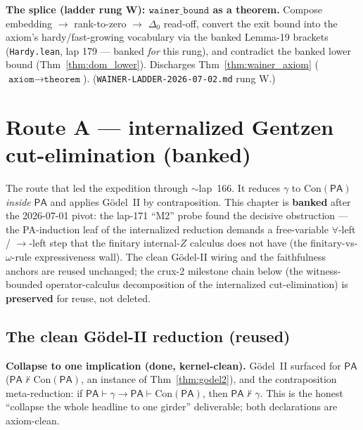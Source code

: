 \begin{theorem}\label{thm:wainer_splice}
  \leanok
\textbf{The splice (ladder rung W): \(\texttt{wainer\_bound}\) as a theorem.}  Compose
embedding \(\to\) rank-to-zero \(\to\) \(\Delta_0\) read-off, convert the exit bound into the
axiom's hardy/fast-growing vocabulary via the banked Lemma-19 brackets (\texttt{Hardy.lean},
lap 179 --- banked \emph{for} this rung), and contradict the banked lower bound
(Thm~\ref{thm:dom_lower}).  Discharges Thm~\ref{thm:wainer_axiom}
(\(\texttt{axiom}\to\texttt{theorem}\)).  (\texttt{WAINER-LADDER-2026-07-02.md} rung W.)
\end{theorem}


\chapter{Route A --- internalized Gentzen cut-elimination (banked)}\label{chp:routeA}

The route that led the expedition through \(\sim\)lap~166.  It reduces \(\gamma\) to
\(\mathrm{Con}(\mathsf{PA})\) \emph{inside} \(\mathsf{PA}\) and applies Gödel~II by contraposition.  This
chapter is \textbf{banked} after the 2026-07-01 pivot: the lap-171 ``M2'' probe found the decisive
obstruction --- the PA-induction leaf of the internalized reduction demands a free-variable
\(\forall\)-left / \(\to\)-left step that the finitary internal-\(Z\) calculus does not have (the
finitary-vs-\(\omega\)-rule expressiveness wall).  The clean Gödel-II wiring and the faithfulness
anchors are reused unchanged; the crux-2 milestone chain below (the witness-bounded operator-calculus
decomposition of the internalized cut-elimination) is \textbf{preserved} for reuse, not deleted.

\section{The clean Gödel-II reduction (reused)}

\begin{theorem}\label{thm:godel2_reduction}
  \leanok
\textbf{Collapse to one implication (done, kernel-clean).}  Gödel~II surfaced for \(\mathsf{PA}\)
(\(\mathsf{PA}\nvdash\mathrm{Con}(\mathsf{PA})\), an instance of Thm~\ref{thm:godel2}), and the
contraposition meta-reduction: if \(\mathsf{PA}\vdash\gamma\to\mathsf{PA}\vdash\mathrm{Con}(\mathsf{PA})\),
then \(\mathsf{PA}\nvdash\gamma\).  This is the honest ``collapse the whole headline to one girder''
deliverable; both declarations are axiom-clean.
\end{theorem}

